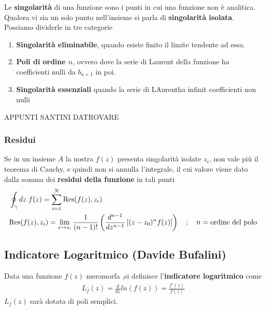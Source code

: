 Le \textbf{singolarità} di una funzione sono i punti in cui  una funzione non è analitica. Qualora vi sia un solo punto nell'insieme si parla di \textbf{singolarità isolata}.
Possiamo dividerle in tre categorie
\begin{enumerate}
	\item \textbf{Singolarità eliminabile}, quando esiste finito il limite tendente ad essa.
	\item \textbf{Poli di ordine $n$}, ovvero dove la serie di Laurent della funzione ha coefficienti nulli da $b_{n+1}$ in poi.
	\item \textbf{Singolarità essenziali} quando la serie di LAurentha infinit coefficienti non nulli
\end{enumerate}

APPUNTI SANTINI DATROVARE

\subsubsection{Residui}

Se in un insieme $A$ la nostra $f(z)$ presenta singolarità isolate $z_i$, non vale più il teorema di Cauchy, e quindi non si annulla l'integrale, il cui valore viene dato dalla somma dei \textbf{residui della funzione} in tali punti
\begin{align}
	&\oint_\gamma dz \; f(z) = \sum_{i=1}^N \text{Res} (f(z), z_i)\\
	&\text{Res} (f(z), z_i) = \underset{z \rightarrow z_i}{\lim} \, \frac{1}{(n-1)!} \left( \frac{d^{n-1}}{dz^{n-1}} \left[ (z-z_0)^n f(z) \right] \right) \quad ; \quad n = \text{ordine del polo}
\end{align}


\subsection{Indicatore Logaritmico (Davide Bufalini)}
Data una funzione $f(z)$ meromorfa ,si definisce l'\textbf{indicatore logaritmico} come
\begin{align}
	L_f(z) = \frac{d}{dz}ln(f(z)) = \frac{f'(z)}{f(z)}
\end{align}
$L_f(z)$ sarà dotata di poli semplici.

